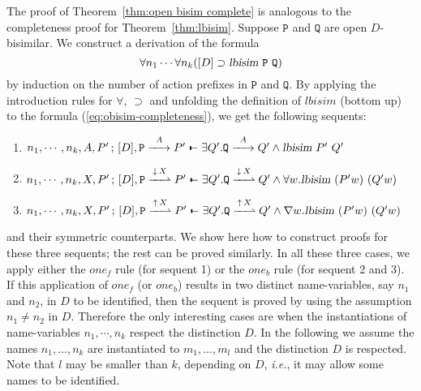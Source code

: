 \documentclass{acmtrans2m}
\newcommand{\ie}{{\em i.e.}}
\def\Ppi{{\mathtt P}}
\def\Qpi{{\mathtt Q}}
\def\relbar{\mathrel{\smash-}}
\def\joinrelm{\mathrel{\mkern-3.2mu}}
\def\tailpiece{\kern 1pt\vrule height 1ex width 0.3ex depth -.25ex}
\def\seqsym{\mathrel{\tailpiece\joinrelm\relbar}}
\newcommand{\NSeq}[3]{#1\,;\,#2 \seqsym #3}
\newcommand{\lbisim}[2]{\hbox{\sl lbisim}~#1~#2}
\newcommand{\inact}{\mathop{\downarrow}}
\newcommand{\oimp}{\supset}
\newcommand{\one  }[3]{#1\stackrel{#2}{-\!\!-\!\!\!\rightarrow    } #3}
\newcommand{\onep }[3]{#1\stackrel{#2}{-\!\!-\!\!\!\rightharpoonup} #3}
\newcommand{\outact}{\mathop{\uparrow}}
\begin{document}
The proof of Theorem~\ref{thm:open bisim complete}
is analogous to the completeness proof for Theorem~\ref{thm:lbisim}.
Suppose $\Ppi$ and $\Qpi$ are open $D$-bisimilar. We construct a derivation of
the formula 
\begin{equation}
\label{eq:obisim-completeness}
\forall n_1 \cdots \forall n_k ([D] \oimp \lbisim \Ppi \Qpi)
\end{equation}
by induction on the number of action prefixes in $\Ppi$ and $\Qpi.$ 
By applying the introduction rules
for $\forall$, $\oimp$ and unfolding the definition of $lbisim$ (bottom up) 
to the formula (\ref{eq:obisim-completeness}), we get the following sequents:
\begin{enumerate}
\item $\NSeq{n_1, \cdots, n_k, A, P'}{[D], \one{\Ppi}{A}{P'}}
           {\exists Q'. \one {\Qpi}{A}{Q'} \land \lbisim{P'}{Q'}}$
\item $\NSeq{n_1, \cdots, n_k, X, P'}{[D], \onep{\Ppi}{\inact X}{P'}}
           {\exists Q'. \onep {\Qpi}{\inact X}{Q'} \land \forall w. \lbisim{(P'w)}{(Q'w)}}$
\item $\NSeq{n_1, \cdots, n_k, X, P'}{[D], \onep{\Ppi}{\outact X}{P'}}
           {\exists Q'. \onep {\Qpi}{\outact X}{Q'} \land \nabla w. \lbisim{(P'w)}{(Q'w)}}$
\end{enumerate}
and their symmetric counterparts. 
We show here how to construct proofs for these three sequents; the rest can be
proved similarly. In all these three cases, we apply either the $one_f$ rule (for sequent 1) 
or the $one_b$ rule (for sequent 2 and 3). If this application of $one_f$ (or $one_b$)
results in two distinct name-variables, say $n_1$ and $n_2$, in $D$ to be identified, then
the sequent is proved by using the assumption $n_1 \not = n_2$ in $D$. Therefore the only 
interesting cases are when the instantiations of name-variables $n_1, \cdots, n_k$ respect the
distinction $D$. 
In the following we assume the names $n_1, \ldots, n_k$ are instantiated to 
$m_1, \ldots, m_l$ and the distinction $D$ is respected. 
Note that $l$ may be smaller than $k$, depending on $D$, \ie, it may allow
some names to be identified. 
\end{document}
